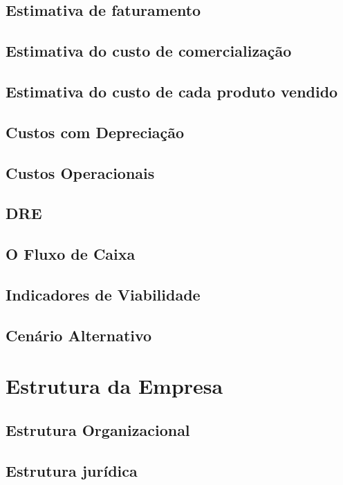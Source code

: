 \documentclass[a4paper, 12pt]{paper}
\begin{document}
\subsection{Estimativa de faturamento}
\subsection{Estimativa do custo de comercialização}
\subsection{Estimativa do custo de cada produto vendido}
\subsection{Custos com Depreciação}
\subsection{Custos Operacionais}
\subsection{DRE}
\subsection{O Fluxo de Caixa}
\subsection{Indicadores de Viabilidade}
\subsection{Cenário Alternativo}
\newpage
\section{Estrutura da Empresa}
\subsection{Estrutura Organizacional}
\subsection{Estrutura jurídica}
\end{document}
